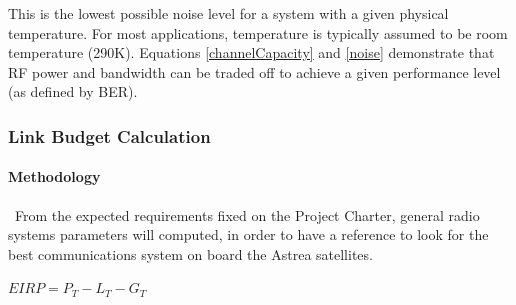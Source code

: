 This is the lowest possible noise level for a system with a given physical temperature. For most applications, temperature is typically assumed to be room temperature (290K). Equations \ref{channelCapacity} and \ref{noise} demonstrate that RF power and bandwidth can be traded off to achieve a given performance level (as defined by BER).

\subsubsection{Link Budget Calculation}
\paragraph{Methodology} \ From the expected requirements fixed on the Project Charter, general radio systems parameters will computed, in order to have a reference to look for the best communications system on board the Astrea satellites.

$EIRP=P_T-L_T-G_T$

